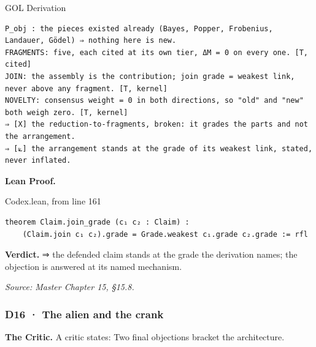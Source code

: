 \documentclass[10pt,twocolumn]{article}
\begin{document}
\begin{golbox}{GOL Derivation}
\begin{lstlisting}[style=golv]
P_obj : the pieces existed already (Bayes, Popper, Frobenius, Landauer, Gödel) ⇒ nothing here is new.
FRAGMENTS: five, each cited at its own tier, ΔM = 0 on every one. [T, cited]
JOIN: the assembly is the contribution; join grade = weakest link, never above any fragment. [T, kernel]
NOVELTY: consensus weight = 0 in both directions, so "old" and "new" both weigh zero. [T, kernel]
⇒ [X] the reduction-to-fragments, broken: it grades the parts and not the arrangement.
⇒ [⟀] the arrangement stands at the grade of its weakest link, stated, never inflated.
\end{lstlisting}
\end{golbox}

\textbf{Lean Proof.}

\begin{leanexcerpt}{Codex.lean, from line 161}
\begin{lstlisting}[style=leanx,firstnumber=161]
theorem Claim.join_grade (c₁ c₂ : Claim) :
    (Claim.join c₁ c₂).grade = Grade.weakest c₁.grade c₂.grade := rfl
\end{lstlisting}
\end{leanexcerpt}

\textbf{Verdict.} ⇒ the defended claim stands at the grade the
derivation names; the objection is answered at its named mechanism.

\emph{Source: Master Chapter 15, §15.8.}

\hypertarget{d16-the-alien-and-the-crank}{%
\subsubsection{D16 · The alien and the
crank}\label{d16-the-alien-and-the-crank}}

\textbf{The Critic.} A critic states: Two final objections bracket the
architecture.
\end{document}
